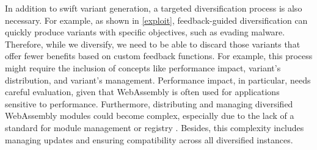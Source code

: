 In addition to swift variant generation, a targeted diversification process is also necessary. 
For example, as shown in \autoref{exploit}, feedback-guided diversification can quickly produce variants with specific objectives, such as evading malware. 
Therefore, while we diversify, we need to be able to discard those variants that offer fewer benefits based on custom feedback functions.
For example, this process might require the inclusion of concepts like performance impact, variant's distribution, and variant's management. 
Performance impact, in particular, needs careful evaluation, given that WebAssembly is often used for applications sensitive to performance. 
Furthermore, distributing and managing diversified WebAssembly modules could become complex, especially due to the lack of a standard for \Wasm module management or registry \cite{10.1145/3526059.3533618}.
Besides, this complexity includes managing updates and ensuring compatibility across all diversified instances.


